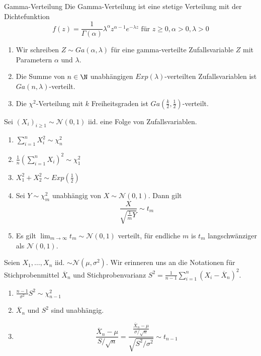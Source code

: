 \begin{subbox}{Gamma-Verteilung}
	Die Gamma-Verteilung ist eine stetige Verteilung mit der Dichtefunktion
	\[f(z) = \frac{1}{\Gamma(\alpha)}\lambda^{\alpha}z^{\alpha-1}e^{-\lambda z} \text{ für } z \geq 0, \alpha >0, \lambda > 0\]
	\begin{enumerate}
		\item Wir schreiben $Z \sim Ga(\alpha, \lambda)$ für eine gamma-verteilte Zufallsvariable $Z$ mit Parametern $\alpha$ und $\lambda$.
		\item Die Summe von $n \in \N$ unabhängigen $Exp(\lambda)$-verteilten Zufallsvariablen ist $Ga(n, \lambda)$-verteilt.
		\item Die $\chi^2$-Verteilung mit $k$ Freiheitsgraden ist $Ga\left(\frac{k}{2}, \frac{1}{2}\right)$-verteilt. 
	\end{enumerate}
\end{subbox}
Sei $(X_i)_{i \geq 1} \sim \mathcal{N}(0,1)$ iid. eine Folge von Zufallsvariablen. 
\begin{enumerate}
	\item $\sum_{i = 1}^{n} X_i^2 \sim \chi^2_n$
	\item $\frac{1}{n}(\sum_{i = 1}^n X_i)^2 \sim \chi_1^2$
	\item $X_1^2 + X_2^2 \sim Exp\left(\frac{1}{2}\right)$
	\item Sei $Y \sim \chi_m^2$ unabhängig von $X \sim \mathcal{N}(0,1)$. Dann gilt \[\frac{X}{\sqrt{\frac{1}{m}Y}} \sim t_m\] 
	\item Es gilt $\lim_{m\to\infty} t_m \sim \mathcal{N}(0,1)$ verteilt, für endliche $m$ is $t_m$ langschwänziger als $\mathcal{N}(0,1).$
\end{enumerate}
Seien $X_1, \ldots, X_n$ iid. $\sim \mathcal{N}(\mu, \sigma^2)$.
Wir erinneren uns an die Notationen für Stichprobenmittel $\overline{X}_n$ und Stichprobenvarianz $S^2 = \frac{1}{n-1}\sum_{i = 1}^n(X_i - \overline{X}_n)^2$.
\begin{enumerate}
	\item $\frac{n-1}{\sigma^2}S^2 \sim \chi_{n-1}^2$
	\item $\overline{X}_n$ und $S^2$ sind unabhängig.
	\item \[\frac{\overline{X}_n - \mu}{S/\sqrt{n}} = \frac{\frac{\overline{X}_n - \mu}{\sigma / \sqrt{n}}}{\sqrt{S^2/\sigma^2}} \sim t_{n-1}\]
\end{enumerate}

